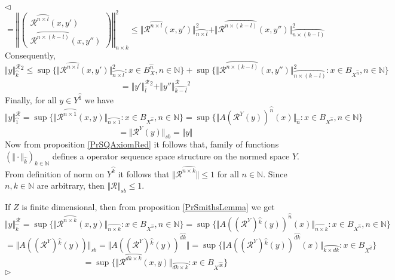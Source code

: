 \documentclass[12pt]{article}
\newenvironment{proof}{\par $\triangleleft$}{$\triangleright$}
\begin{document}
\begin{proof}
$$=\left\Vert\begin{pmatrix}\mathcal{R}^{\wideparen{n\times l}}(x,y')\\ \mathcal{R}^{\wideparen{n\times (k-l)}}(x,y'')\end{pmatrix}\right\Vert_{n\times k}^2
\leq\Vert\mathcal{R}^{\wideparen{n\times l}}(x,y')\Vert_{\wideparen{n\times l}}^2
+\Vert\mathcal{R}^{\wideparen{n\times (k-l)}}(x,y'')\Vert_{\wideparen{n\times (k-l)}}^2
$$
Consequently,
$$
\Vert y\Vert_{\wideparen{k}}^{\mathcal{R}}{}^2
\leq\sup\{\Vert\mathcal{R}^{\wideparen{n\times l}}(x,y')\Vert_{\wideparen{n\times l}}^2:x\in B_X^{\wideparen{n}},n\in\mathbb{N}\}
+\sup\{\Vert\mathcal{R}^{\wideparen{n\times (k-l)}}(x,y'')\Vert_{\wideparen{n\times (k-l)}}^2:x\in B_{X^{\wideparen{n}}},n\in\mathbb{N}\}
$$
$$
=\Vert y'\Vert_{\wideparen{l}}^{\mathcal{R}}{}^2
+\Vert y''\Vert_{\wideparen{k-l}}^{\mathcal{R}}{}^2
$$
Finally, for all $y\in Y^{\wideparen{1}}$ we have
$$
\Vert y\Vert_{\wideparen{1}}^{\mathcal{R}}
=\sup\{\Vert\mathcal{R}^{\wideparen{n\times 1}}(x,y)\Vert_{\wideparen{n\times 1}}:x\in B_{X^{\wideparen{n}}},n\in\mathbb{N}\}
=\sup\{\Vert A(\mathcal{R}^Y(y))^{\wideparen{n}}(x)\Vert_{\wideparen{n}}:x\in B_{X^{\wideparen{n}}},n\in\mathbb{N}\}
$$
$$
=\Vert \mathcal{R}^Y(y)\Vert_{sb}=\Vert y\Vert
$$
Now from proposition \ref{PrSQAxiomRed} it follows that, family of functions $(\Vert\cdot\Vert_{\wideparen{k}})_{k\in\mathbb{N}}$ defines a operator sequence space structure on the normed space $Y$. From definition of norm on $Y^{\wideparen{k}}$ it follows that $\Vert\mathcal{R}^{\wideparen{n\times k}}\Vert\leq 1$ for all $n\in\mathbb{N}$. Since $n,k\in\mathbb{N}$ are arbitrary, then $\Vert\mathcal{R}\Vert_{sb}\leq 1$.

If $Z$ is finite dimensional, then from proposition \ref{PrSmithsLemma} we get
$$
\Vert y\Vert_{\wideparen{k}}^{\mathcal{R}}
=\sup\{\Vert\mathcal{R}^{\wideparen{n\times k}}(x,y)\Vert_{\wideparen{n\times k}}:x\in B_{X^{\wideparen{n}}},n\in\mathbb{N}\}
=\sup\{\Vert A((\mathcal{R}^Y){}^{\wideparen{k}}(y))^{\wideparen{n}}(x)\Vert_{\wideparen{n\times k}}:x\in B_{X^{\wideparen{n}}},n\in\mathbb{N}\}
$$
$$
=\Vert A((\mathcal{R}^Y){}^{\wideparen{k}}(y))\Vert_{sb}
=\Vert A((\mathcal{R}^Y){}^{\wideparen{k}}(y))^{\wideparen{dk}}\Vert
=\sup\{\Vert A((\mathcal{R}^Y){}^{\wideparen{k}}(y))^{\wideparen{dk}}(x)\Vert_{\wideparen{k\times dk}}:x\in B_{X^{\wideparen{d}}}\}
$$
$$
=\sup\{\Vert\mathcal{R}^{\wideparen{dk\times k}}(x,y)\Vert_{\wideparen{dk\times k}}:x\in B_{X^{\wideparen{dk}}}\}
$$
\end{proof}
\end{document}

